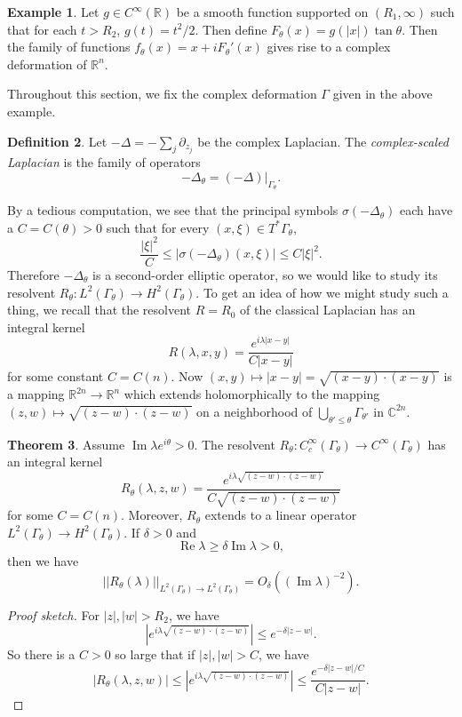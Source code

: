 \documentclass[12pt]{report}
\newcommand{\RR}{\mathbb{R}}
\newcommand{\CC}{\mathbb{C}}
\renewcommand{\Re}{\operatorname{Re}}
\renewcommand{\Im}{\operatorname{Im}}
\newcommand{\dfn}[1]{\emph{#1}\index{#1}}
\theoremstyle{definition}
\newtheorem{theorem}{Theorem}[chapter]
\newtheorem{definition}[theorem]{Definition}
\newtheorem{example}[theorem]{Example}
\begin{document}
\begin{defintion}
\begin{example}
    Let $g \in C^\infty(\RR)$ be a smooth function supported on $(R_1, \infty)$ such that for each $t > R_2$, $g(t) = t^2/2$. Then define $F_\theta(x) = g(|x|)\tan \theta$. Then the family of functions $f_\theta(x) = x + iF_\theta'(x)$ gives rise to a complex deformation of $\RR^n$.
\end{example}
Throughout this section, we fix the complex deformation $\Gamma$ given in the above example.
\begin{definition}
    Let $-\Delta = -\sum_j \partial_{z_j}$ be the complex Laplacian. The \dfn{complex-scaled Laplacian} is the family of operators
    $$-\Delta_\theta = (-\Delta)|_{\Gamma_\theta}.$$
\end{definition}
By a tedious computation, we see that the principal symbols $\sigma(-\Delta_\theta)$ each have a $C = C(\theta) > 0$ such that for every $(x, \xi) \in T^*\Gamma_\theta$,
$$\frac{|\xi|^2}{C} \leq |\sigma(-\Delta_\theta)(x, \xi)| \leq C|\xi|^2.$$
Therefore $-\Delta_\theta$ is a second-order elliptic operator, so we would like to study its resolvent $R_\theta: L^2(\Gamma_\theta) \to H^2(\Gamma_\theta)$. To get an idea of how we might study such a thing, we recall that the resolvent $R = R_0$ of the classical Laplacian has an integral kernel
$$R(\lambda, x, y) = \frac{e^{i\lambda|x-y|}}{C|x-y|}$$
for some constant $C = C(n)$. Now $(x, y) \mapsto |x - y| = \sqrt{(x - y)\cdot(x-y)}$ is a mapping $\RR^{2n} \to \RR^n$ which extends holomorphically to the mapping $(z, w) \mapsto \sqrt{(z-w)\cdot(z-w)}$ on a neighborhood of $\bigcup_{\theta' \leq \theta} \Gamma_{\theta'}$ in $\CC^{2n}$.
\begin{theorem}
    Assume $\Im \lambda e^{i\theta} > 0$. The resolvent $R_\theta: C^\infty_c(\Gamma_\theta) \to C^\infty(\Gamma_\theta)$ has an integral kernel
    $$R_\theta(\lambda, z, w) = \frac{e^{i\lambda\sqrt{(z-w)\cdot(z-w)}}}{C\sqrt{(z-w)\cdot(z-w)}}$$
    for some $C = C(n)$. Moreover, $R_\theta$ extends to a linear operator $L^2(\Gamma_\theta) \to H^2(\Gamma_\theta)$. If $\delta > 0$ and
    $$\Re \lambda \geq \delta \Im \lambda > 0,$$
    then we have
    $$||R_\theta(\lambda)||_{L^2(\Gamma_\theta) \to L^2(\Gamma_\theta)} = O_\delta((\Im \lambda)^{-2}).$$
\end{theorem}
\begin{proof}[Proof sketch]
    For $|z|,|w| > R_2$, we have
    $$|e^{i\lambda\sqrt{(z-w)\cdot(z-w)}}| \leq e^{-\delta|z-w|}.$$
    So there is a $C > 0$ so large that if $|z|,|w| > C$, we have
    $$|R_\theta(\lambda, z, w)| \leq |e^{i\lambda\sqrt{(z-w)\cdot(z-w)}}| \leq \frac{e^{-\delta|z-w|/C}}{C|z-w|}.$$

\end{proof}
\end{defintion}
\end{document}
